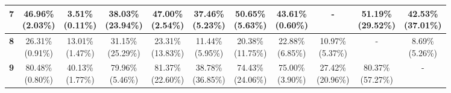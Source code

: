 \documentclass{report}
\begin{document}
\begin{center}
{\begin{tabular}{|c|c|c|c|c|c|c|c|c|c|c|}
  \textbf{7} & \makecell{46.96\% \\ (2.03\%)} & \makecell{3.51\% \\ (0.11\%)} & \makecell{38.03\% \\ (23.94\%)} & \makecell{47.00\% \\ (2.54\%)} & \makecell{37.46\% \\ (5.23\%)} & \makecell{50.65\% \\ (5.63\%)} & \makecell{43.61\% \\ (0.60\%)} & - & \makecell{51.19\% \\ (29.52\%)} & \makecell{42.53\% \\ (37.01\%)} \\ \hline
  \textbf{8} & \makecell{26.31\% \\ (0.91\%)} & \makecell{13.01\% \\ (1.47\%)} & \makecell{31.15\% \\ (25.29\%)} & \makecell{23.31\% \\ (13.83\%)} & \makecell{11.44\% \\ (5.95\%)} & \makecell{20.38\% \\ (11.75\%)} & \makecell{22.88\% \\ (6.85\%)} & \makecell{10.97\% \\ (5.37\%)} & - & \makecell{8.69\% \\ (5.26\%)} \\ \hline
  \textbf{9} & \makecell{80.48\% \\ (0.80\%)} & \makecell{40.13\% \\ (1.77\%)} & \makecell{79.96\% \\ (5.46\%)} & \makecell{81.37\% \\ (22.60\%)} & \makecell{38.78\% \\ (36.85\%)} & \makecell{74.43\% \\ (24.06\%)} & \makecell{75.00\% \\ (3.90\%)} & \makecell{27.42\% \\ (20.96\%)} & \makecell{80.37\% \\ (57.27\%)} & - \\ \hline
     \end{tabular}
}
\end{center}
\end{document}
